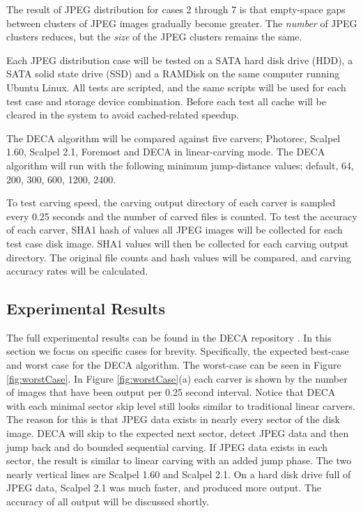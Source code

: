 \documentclass[final,5p,times,twocolumn,authoryear]{elsarticle}
\begin{document}
The result of JPEG distribution for cases 2 through 7 is that empty-space gaps between clusters of JPEG images gradually become greater. The \emph{number} of JPEG clusters reduces, but the \emph{size} of the JPEG clusters remains the same.

Each JPEG distribution case will be tested on a SATA hard disk drive (HDD), a SATA solid state drive (SSD) and a RAMDisk on the same computer running Ubuntu Linux. All tests are scripted, and the same scripts will be used for each test case and storage device combination. Before each test all cache will be cleared in the system to avoid cached-related speedup.

The DECA algorithm will be compared against five carvers; Photorec, Scalpel 1.60, Scalpel 2.1, Foremost and DECA in linear-carving mode. The DECA algorithm will run with the following minimum jump-distance values; default, 64, 200, 300, 600, 1200, 2400.

To test carving speed, the carving output directory of each carver is sampled every 0.25 seconds and the number of carved files is counted. To test the accuracy of each carver, SHA1 hash of values all JPEG images will be collected for each test case disk image. SHA1 values will then be collected for each carving output directory. The original file counts and hash values will be compared, and carving accuracy rates will be calculated.

\subsection{Experimental Results}
The full experimental results can be found in the DECA repository \cite{gladyshevjames2015}. In this section we focus on specific cases for brevity. Specifically, the expected best-case and worst case for the DECA algorithm. The worst-case can be seen in Figure \ref{fig:worstCase}. In Figure \ref{fig:worstCase}(a) each carver is shown by the number of images that have been output per 0.25 second interval. Notice that DECA with each minimal sector skip level still looks similar to traditional linear carvers. The reason for this is that JPEG data exists in nearly every sector of the disk image. DECA will skip to the expected next sector, detect JPEG data and then jump back and do bounded sequential carving. If JPEG data exists in each sector, the result is similar to linear carving with an added jump phase. The two nearly vertical lines are Scalpel 1.60 and Scalpel 2.1. On a hard disk drive full of JPEG data, Scalpel 2.1 was much faster, and produced more output. The accuracy of all output will be discussed shortly.
\end{document}
